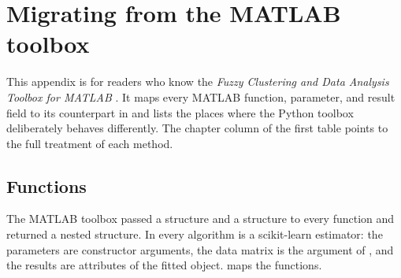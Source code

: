 \chapter{Migrating from the MATLAB toolbox}\label{app:migration}
\begin{roadmap}
This appendix is for readers who know the \emph{Fuzzy Clustering and Data Analysis Toolbox for MATLAB} \cite{balasko:2005:toolbox}. It maps every MATLAB function, parameter, and result field to its counterpart in  and lists the places where the Python toolbox deliberately behaves differently. The chapter column of the first table points to the full treatment of each method.
\end{roadmap}

\section{Functions}

The MATLAB toolbox passed a  structure and a  structure to every function and returned a nested  structure. In  every algorithm is a scikit-learn estimator: the parameters are constructor arguments, the data matrix is the argument of , and the results are attributes of the fitted object.  maps the functions.

